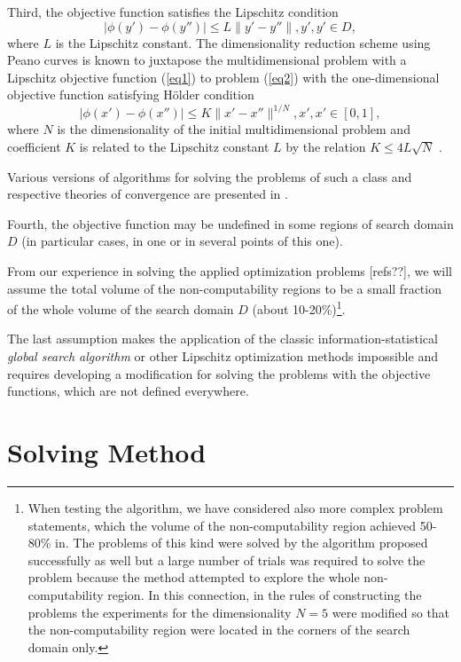 \documentclass[runningheads]{llncs}
\begin{document}
Third, the objective function satisfies the Lipschitz condition
\begin{equation}\label{eq3} 
| \phi (y')-\phi (y'') | \leq L \| y'-y'' \|, y',y' \in D,
\end{equation}
where $L$ is the Lipschitz constant. The dimensionality reduction scheme using Peano curves is known to juxtapose the multidimensional problem with a Lipschitz objective function (\ref{eq1}) to problem (\ref{eq2}) with the one-dimensional objective function satisfying H{\"o}lder condition
\begin{equation}\label{eq4} 
| \phi (x')-\phi (x'') | \leq K \| x'-x'' \| ^{1/N}, x',x' \in [0,1],
\end{equation}
where $N$ is the dimensionality of the initial multidimensional problem and coefficient $K$ is related to the Lipschitz constant $L$ by the relation $K \leq 4L\sqrt N$ \cite{Strongin2000}.

Various versions of algorithms for solving the problems of such a class and respective theories of convergence are presented in \cite{Gourdin1996,Lera2015,strongin1978}.

Fourth, the objective function may be undefined in some regions of search domain $D$ (in particular cases, in one or in several points of this one).

From our experience in solving the applied optimization problems [refs??], we will assume the total volume of the non-computability regions to be a small fraction of the whole volume of the search domain $D$ (about 10-20\%)\footnote{When testing the algorithm, we have considered also more complex problem statements, which the volume of the non-computability region achieved 50-80\% in. The problems of this kind were solved by the algorithm proposed successfully as well but a large number of trials was required to solve the problem because the method attempted to explore the whole non-computability region. In this connection, in the rules of constructing the problems the experiments for the dimensionality $N=5$ were modified so that the non-computability region were located in the corners of the search domain only.}.

The last assumption makes the application of the classic information-statistical \textit{global search algorithm} \cite{indexMethod,strongin1978} or other Lipschitz optimization methods impossible and requires developing a modification for solving the problems with the objective functions, which are not defined everywhere.

\section{Solving Method}
\end{document}
